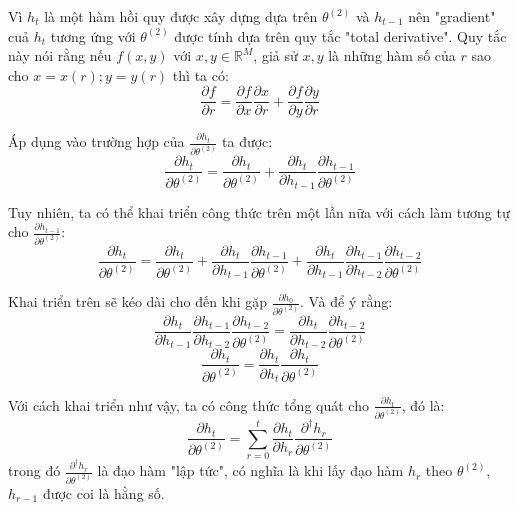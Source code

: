 Vì $h_t$ là một hàm hồi quy được xây dựng dựa trên $\theta^{(2)}$ và $h_{t-1}$ nên "gradient" cuả $h_t$ tương ứng với $\theta^{(2)}$ được tính dựa trên quy tắc "total derivative". Quy tắc này nói rằng nếu $f(x,y)$ với $x, y \in \mathbb{R}^M$, giả sử $x,y$ là những hàm số của $r$ sao cho $x = x(r); y = y(r)$ thì ta có:
\begin{equation} \label{gradientWRTSt6}
\frac{\partial{f}}{\partial{r}} = \frac{\partial f}{\partial x}\frac{\partial x }{\partial r} + \frac{\partial f }{\partial y }\frac{\partial y }{\partial r }
\end{equation}

Áp dụng vào trường hợp của $\frac{\partial h_t}{\partial \theta^{(2)} }$ ta được:
\begin{equation} \label{gradientWRTSt7}
\frac{\partial h_t}{ \partial \theta^{(2)}} = \frac{\partial h_t}{ \partial \theta^{(2)}} + \frac{\partial h_t }{\partial h_{t-1} } \frac{\partial h_{t-1}}{ \partial \theta^{(2)}}
\end{equation}

Tuy nhiên, ta có thể khai triển công thức trên một lần nữa với cách làm tương tự cho $\frac{\partial h_{t-1}}{\partial \theta^{(2)} }$:
\begin{equation} \label{gradientWRTSt8}
\frac{\partial h_t}{\partial \theta^{(2)}} = \frac{\partial h_t}{\partial \theta^{(2)}} + \frac{\partial h_t }{\partial h_{t-1}} \frac{\partial h_{t-1}}{\partial \theta^{(2)}} + \frac{\partial h_t}{\partial h_{t-1}} \frac{\partial h_{t-1}}{\partial h_{t-2}} \frac{\partial h_{t-2}}{\partial \theta^{(2)}}
\end{equation}

Khai triển trên sẽ kéo dài cho đến khi gặp $\frac{\partial h_0}{\partial \theta^{(2)}}$. Và để ý rằng:
\begin{equation} \label{gradientWRTSt9}
\frac{\partial h_t}{\partial h_{t-1}} \frac{\partial h_{t-1}}{\partial h_{t-2}} \frac{\partial h_{t-2}}{\partial \theta^{(2)}} = \frac{\partial h_t}{\partial h_{t-2}}\frac{\partial h_{t-2}}{\partial \theta^{(2)}}
\end{equation}
\begin{equation} \label{gradientWRTSt10}
\frac{\partial h_{t}}{\partial \theta^{(2)}} = \frac{\partial h_{t}}{\partial h_t} \frac{\partial h_t}{\partial \theta^{(2)}}
\end{equation}

Với cách khai triển như vậy, ta có công thức tổng quát cho $\frac{\partial h_t}{\partial \theta^{(2)}}$, đó là:
\begin{equation} \label{gradientWRTSt11}
\frac{\partial h_t}{\partial \theta^{(2)}} = \sum_{r=0}^{t} \frac{\partial h_{t}}{\partial h_r} \frac{\partial^{\dagger} h_r}{\partial \theta^{(2)}}
\end{equation}
trong đó $\frac{\partial^{\dagger} h_r}{\partial \theta^{(2)}}$ là đạo hàm "lập tức", có nghĩa là khi lấy đạo hàm $h_r$ theo $\theta^{(2)}$, $h_{r-1}$ được coi là hằng số.

